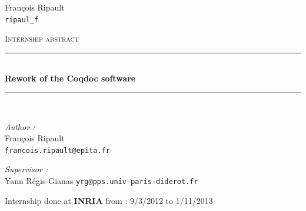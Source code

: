 \begin{titlepage}

  \begin{minipage}{0.4\textwidth}
  \begin{flushleft}
    François Ripault \\
    \texttt{ripaul\_f}
  \end{flushleft}
\end{minipage}
\vfill
\begin{center}
  \textsc{\Large Internship abstract}

\vfill

\rule{\linewidth}{0.5mm} \\[0.4cm]
{\huge \bfseries Rework of the Coqdoc software}
\rule{\linewidth}{0.5mm} \\[1.5cm]

\begin{minipage}{0.4\textwidth}
\begin{flushleft} \large
\emph{Author :}\\
François Ripault \\
\small
\texttt{francois.ripault@epita.fr}
\end{flushleft}
\end{minipage}
\begin{minipage}{0.4\textwidth}
\begin{flushright} \large
\emph{Supervisor :} \\
Yann Régis-Gianas
\small
\texttt{yrg@pps.univ-paris-diderot.fr}
\end{flushright}
\end{minipage}

\vfill


\vfill
Internship done at \textbf{INRIA} from : 9/3/2012 to 1/11/2013


\end{center}
\end{titlepage}
